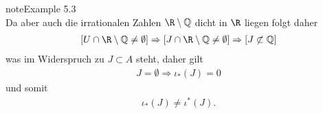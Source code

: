 \documentclass[letterpaper,10pt,english]{jupyterBook}
\begin{document}
\begin{sphinxadmonition}{note}{Example 5.3}
\begin{equation*}
\end{equation*}
\sphinxAtStartPar
Da aber auch die irrationalen Zahlen \(\R\setminus \mathbb{Q}\) dicht in \(\R\) liegen folgt daher
\begin{equation*}
\begin{split}\left[U\cap\R\setminus \mathbb{Q} \neq \emptyset\right] 
\Rightarrow 
\left[J \cap \R\setminus \mathbb{Q} \neq \emptyset\right]
\Rightarrow 
\left[J\not\subset \mathbb{Q}\right]\end{split}
\end{equation*}
\sphinxAtStartPar
was im Widerspruch zu \(J\subset A\) steht, daher gilt
\begin{equation*}
\begin{split}J=\emptyset\Rightarrow \iota_\ast(J) = 0\end{split}
\end{equation*}
\sphinxAtStartPar
und somit
\begin{equation*}
\begin{split}\iota_\ast(J) \neq \iota^\ast(J).\end{split}
\end{equation*}\end{sphinxadmonition}
\end{document}
